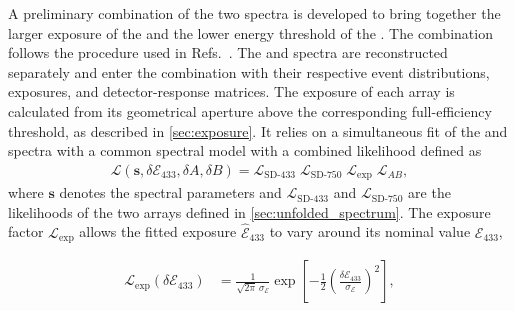 \documentclass[main.tex]{subfiles}
\begin{document}
A preliminary combination of the two spectra is developed to bring together the larger exposure of the  and the lower energy threshold of the .
The combination follows the procedure used in Refs.~\cite{PierreAuger:2021:InfillSpectrum,PierreAuger:2025:Declination}.
The  and  spectra are reconstructed separately and enter the combination with their respective event distributions, exposures, and detector-response matrices. The exposure of each array is calculated from its geometrical aperture above the corresponding full-efficiency threshold, as described in \cref{sec:exposure}.
It relies on a simultaneous fit of the  and  spectra with a common spectral model with a combined likelihood defined as
\begin{align}
    \mathcal{L}
    \left(
    \mathbf{s},
    \delta\mathcal E_{433},
    \delta A,
    \delta B
    \right)
    =
    \mathcal{L}_{\mathrm{SD\text{-}433}}\;
    \mathcal{L}_{\mathrm{SD\text{-}750}}\;
    \mathcal{L}_{\mathrm{exp}}\;
    \mathcal{L}_{AB},
\end{align}
\noindent where $\mathbf{s}$ denotes the spectral parameters and $\mathcal{L}_{\mathrm{SD\text{-}433}}$ and $\mathcal{L}_{\mathrm{SD\text{-}750}}$ are the likelihoods of the two arrays defined in \cref{sec:unfolded_spectrum}.
The exposure factor $\mathcal{L}_{\mathrm{exp}}$ allows the fitted  exposure $\widehat{\mathcal E}_{433}$ to vary around its nominal value $\mathcal E_{433}$,

\begin{align}
\mathcal L_{\mathrm{exp}}(\delta\mathcal E_{433})
&=
\frac{1}{\sqrt{2\pi}\,\sigma_{\mathcal E}}
\exp\left[
-\frac{1}{2}
\left(
\frac{\delta\mathcal E_{433}}{\sigma_{\mathcal E}}
\right)^2
\right],
\end{align}
\end{document}
